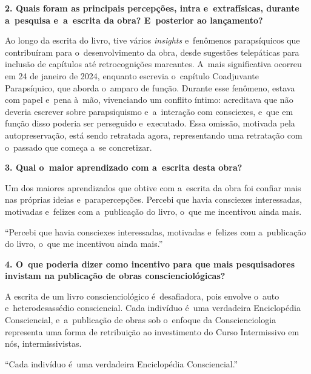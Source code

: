\documentclass{gescons}
\begin{document}
\begin{multicols}{2}
\textbf{2. Quais foram as principais percepções, intra e~extrafísicas, durante a~pesquisa e~a~escrita da obra? E~posterior ao lançamento?}

Ao longo da escrita do livro, tive vários \emph{insights} e~fenômenos parapsíquicos que contribuíram para o~desenvolvimento da obra, desde sugestões telepáticas para inclusão de capítulos até retrocognições marcantes. A~mais significativa ocorreu em 24 de janeiro de 2024, enquanto escrevia o~capítulo Coadjuvante Parapsíquico, que aborda o~amparo de função. Durante esse fenômeno, estava com papel e~pena à~mão, vivenciando um conflito íntimo: acreditava que não deveria escrever sobre parapsiquismo e~a~interação com consciexes, e~que em função disso poderia ser perseguido e~executado. Essa omissão, motivada pela autopreservação, está sendo retratada agora, representando uma retratação com o~passado que começa a~se concretizar.

\textbf{3. Qual o~maior aprendizado com a~escrita desta obra?}

Um dos maiores aprendizados que obtive com a~escrita da obra foi confiar mais nas próprias ideias e~parapercepções. Percebi que havia consciexes interessadas, motivadas e~felizes com a~publicação do livro, o~que me incentivou ainda mais.

\begin{pullquote}
``Percebi que havia consciexes interessadas, motivadas e~felizes com a~publicação do livro, o~que me incentivou ainda mais.''
\end{pullquote}

\textbf{4. O~que poderia dizer como incentivo para que mais pesquisadores invistam na publicação de obras conscienciológicas?}

A escrita de um livro conscienciológico é~desafiadora, pois envolve o~auto e~heterodesassédio consciencial. Cada indivíduo é~uma verdadeira Enciclopédia Consciencial, e~a~publicação de obras sob o~enfoque da Conscienciologia representa uma forma de retribuição ao investimento do Curso Intermissivo em nós, intermissivistas.


\begin{pullquote}
``Cada indivíduo é~uma verdadeira Enciclopédia Consciencial.''
\end{pullquote}

    
    \end{multicols}
\end{document}
